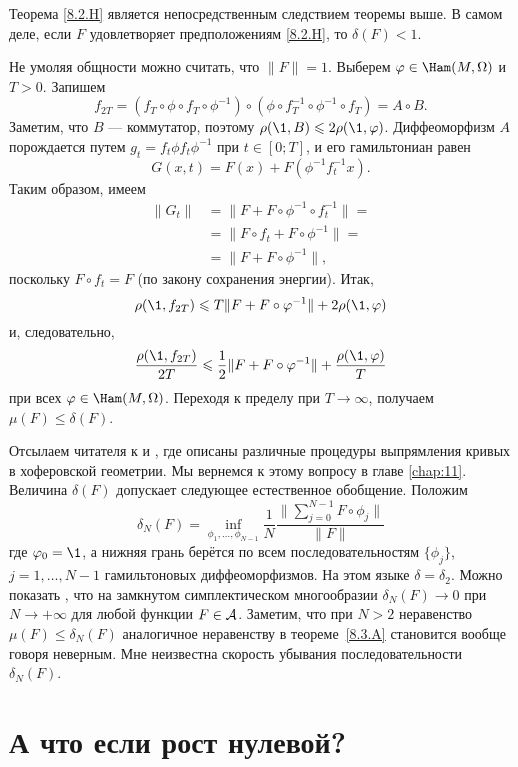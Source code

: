 Теорема \ref{8.2.H} является непосредственным следствием теоремы выше. 
В самом деле, если $F$ удовлетворяет предположениям \ref{8.2.H}, то
$\delta (F) <1$. 

Не умоляя общности можно считать, что $\|F \| = 1$.
Выберем $\phi \in \Ham (M, \Omega)$ и $T> 0$.
Запишем 
\[f_{2T}= (f_T \circ \phi \circ f_T \circ \phi^{-1}) \circ (\phi \circ
f_T^{-1} \circ \phi^{-1} \circ f_T) = A \circ B.\] 
Заметим, что $B$ — коммутатор, поэтому $\rho (\1, B) \le 2\rho (\1, \phi)$.
Диффеоморфизм $A$ порождается путем $g_t = f_t \phi f_t \phi ^{-1}$
при $t \in [0;T]$, и его гамильтониан равен  
\[G (x, t) = F (x) + F (\phi^{-1} f_t^{-1} x).\]
Таким образом, имеем 
\begin{align*}
\|G_t \| &= \|F + F \circ \phi ^{-1} \circ f_t ^{-1} \| =
\\
&=\|F \circ f_t + F \circ \phi ^{-1} \| =
\\
&=\|F + F \circ \phi ^{-1} \|,\end{align*}
поскольку $F \circ f_t = F$ (по закону сохранения энергии).
Итак, 
\[\rho (\1, f_{2T}) \le T \| F + F \circ \phi ^{-1} \| + 2\rho (\1, \phi)\]
и, следовательно, 
\[\frac{\rho (\1, f_{2T})}{2T}
\le\frac12 \|F + F \circ \phi ^{-1} \| + \frac{\rho (\1, \phi)}{T}\]
при всех $\phi \in \Ham (M , \Omega)$.
Переходя к пределу при $T \to \infty$, получаем $\mu (F) \le \delta (F)$.
\qeds

Отсылаем читателя к \cite{LM2} и \cite{P9}, где описаны различные
процедуры выпрямления кривых в хоферовской геометрии. 
Мы вернемся к этому вопросу в главе \ref{chap:11}.
Величина $\delta (F)$ допускает следующее естественное обобщение.
Положим 
\[
\delta_N(F)
=
\inf_{\phi_1 ,\dots, \phi_{N-1}}
\frac1N
\frac{\|\sum_{j=0}^{N-1} F \circ \phi_j\|}{\|F\|}
\] 
где $\phi_0 = \1$, а нижняя грань берётся по всем последовательностям
$\{\phi_j\}$, $j = 1,\dots, N-1 $ гамильтоновых диффеоморфизмов. 
На этом языке $\delta = \delta_2$. 
Можно показать \cite{P9}, что на замкнутом симплектическом
многообразии $\delta_N (F) \to 0$ при $N \to + \infty$ для любой
функции $F \in \mathcal{A}$. Заметим, что при $N>2$ неравенство
$\mu(F)\le\delta_N(F)$ аналогичное неравенству в теореме~\ref{8.3.A}
становится вообще говоря неверным.
Мне неизвестна скорость убывания последовательности $\delta_N (F)$. 

\section{А что если рост нулевой?}\label{sec:8.4}

